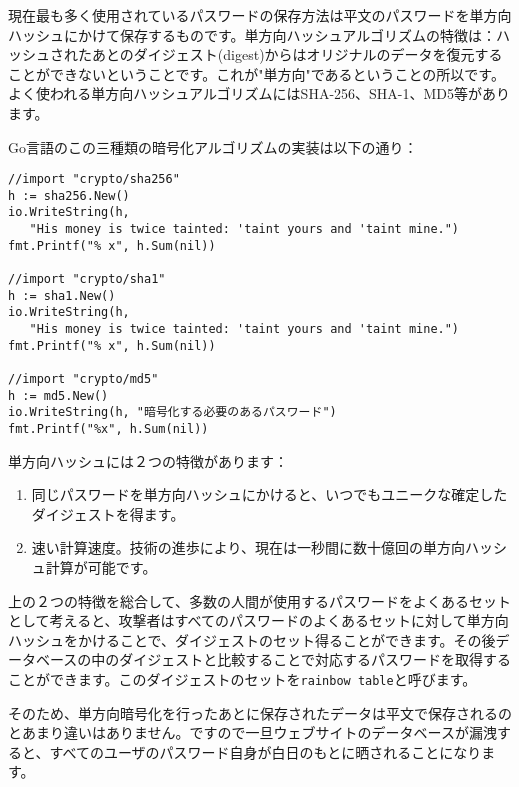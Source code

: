 現在最も多く使用されているパスワードの保存方法は平文のパスワードを単方向ハッシュにかけて保存するものです。単方向ハッシュアルゴリズムの特徴は：ハッシュされたあとのダイジェスト(digest)からはオリジナルのデータを復元することができないということです。これが"単方向"であるということの所以です。よく使われる単方向ハッシュアルゴリズムにはSHA-256、SHA-1、MD5等があります。

Go言語のこの三種類の暗号化アルゴリズムの実装は以下の通り：

\begin{lstlisting}[numbers=none]
//import "crypto/sha256"
h := sha256.New()
io.WriteString(h,
   "His money is twice tainted: 'taint yours and 'taint mine.")
fmt.Printf("% x", h.Sum(nil))

//import "crypto/sha1"
h := sha1.New()
io.WriteString(h,
   "His money is twice tainted: 'taint yours and 'taint mine.")
fmt.Printf("% x", h.Sum(nil))

//import "crypto/md5"
h := md5.New()
io.WriteString(h, "暗号化する必要のあるパスワード")
fmt.Printf("%x", h.Sum(nil))
\end{lstlisting}


単方向ハッシュには２つの特徴があります：

\begin{enumerate}
  \item 同じパスワードを単方向ハッシュにかけると、いつでもユニークな確定したダイジェストを得ます。
  \item 速い計算速度。技術の進歩により、現在は一秒間に数十億回の単方向ハッシュ計算が可能です。
\end{enumerate}

上の２つの特徴を総合して、多数の人間が使用するパスワードをよくあるセットとして考えると、攻撃者はすべてのパスワードのよくあるセットに対して単方向ハッシュをかけることで、ダイジェストのセット得ることができます。その後データベースの中のダイジェストと比較することで対応するパスワードを取得することができます。このダイジェストのセットを\texttt{rainbow table}と呼びます。

そのため、単方向暗号化を行ったあとに保存されたデータは平文で保存されるのとあまり違いはありません。ですので一旦ウェブサイトのデータベースが漏洩すると、すべてのユーザのパスワード自身が白日のもとに晒されることになります。

